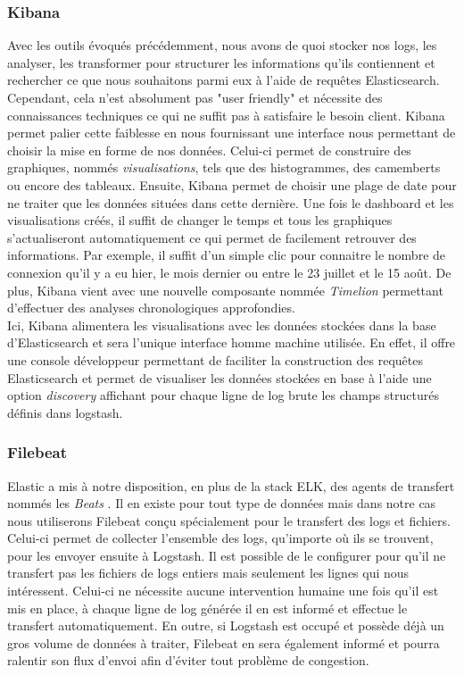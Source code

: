 	\subsubsection{Kibana}
	Avec les outils évoqués précédemment, nous avons de quoi stocker nos logs, les analyser, les transformer pour structurer les informations qu'ils contiennent et rechercher ce que nous souhaitons parmi eux à l'aide de requêtes Elasticsearch. Cependant, cela n'est absolument pas "user friendly" et nécessite des connaissances techniques ce qui ne suffit pas à satisfaire le besoin client. Kibana \cite{bib_kibana} permet palier cette faiblesse en nous fournissant une interface nous permettant de choisir la mise en forme de nos données. Celui-ci permet de construire des graphiques, nommés \textit{visualisations}, tels que des histogrammes, des camemberts ou encore des tableaux. Ensuite, Kibana permet de choisir une plage de date pour ne traiter que les données situées dans cette dernière. Une fois le dashboard et les visualisations créés, il suffit de changer le temps et tous les graphiques s'actualiseront automatiquement ce qui permet de facilement retrouver des informations. Par exemple, il suffit d'un simple clic pour connaitre le nombre de connexion qu'il y a eu hier, le mois dernier ou entre le 23 juillet et le 15 août. De plus, Kibana vient avec une nouvelle composante nommée \textit{Timelion} permettant d'effectuer des analyses chronologiques approfondies. \\
	
	Ici, Kibana alimentera les visualisations avec les données stockées dans la base d'Elasticsearch et sera l'unique interface homme machine utilisée. En effet, il offre une console développeur permettant de faciliter la construction des requêtes Elasticsearch et permet de visualiser les données stockées en base à l'aide une option \textit{discovery} affichant pour chaque ligne de log brute les champs structurés définis dans logstash.
	
	\subsubsection{Filebeat}	
	Elastic a mis à notre disposition, en plus de la stack ELK, des agents de transfert nommés les \textit{Beats} \cite{bib_filebeat}. Il en existe pour tout type de données mais dans notre cas nous utiliserons Filebeat conçu spécialement pour le transfert des logs et fichiers. Celui-ci permet de collecter l'ensemble des logs, qu'importe où ils se trouvent, pour les envoyer ensuite à Logstash. Il est possible de le configurer pour qu'il ne transfert pas les fichiers de logs entiers mais seulement les lignes qui nous intéressent. Celui-ci ne nécessite aucune intervention humaine une fois qu'il est mis en place, à chaque ligne de log générée il en est informé et effectue le transfert automatiquement. En outre, si Logstash est occupé et possède déjà un gros volume de données à traiter, Filebeat en sera également informé et pourra ralentir son flux d'envoi afin d'éviter tout problème de congestion.

